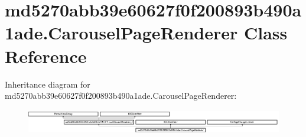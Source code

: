\hypertarget{classmd5270abb39e60627f0f200893b490a1ade_1_1CarouselPageRenderer}{}\section{md5270abb39e60627f0f200893b490a1ade.\+Carousel\+Page\+Renderer Class Reference}
\label{classmd5270abb39e60627f0f200893b490a1ade_1_1CarouselPageRenderer}
Inheritance diagram for md5270abb39e60627f0f200893b490a1ade.\+Carousel\+Page\+Renderer\+:\begin{figure}[H]
\begin{center}
\leavevmode
\includegraphics[height=1.052631cm]{classmd5270abb39e60627f0f200893b490a1ade_1_1CarouselPageRenderer}
\end{center}
\end{figure}

